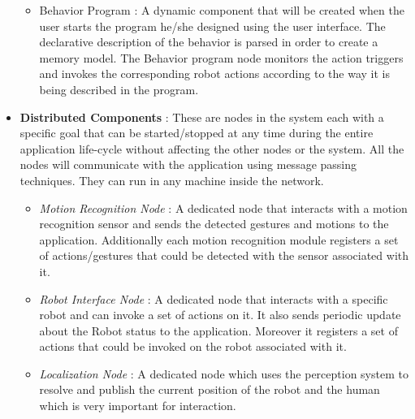 \documentclass{llncs}
\begin{document}
\begin{itemize}
\begin{itemize}
\item Behavior Program : A dynamic component that will be created when the user starts the program he/she designed using the user interface. The declarative description of the behavior is parsed in order to create a memory model. The Behavior program node monitors the action triggers and invokes the corresponding robot actions according to the way it is being described in the program.
\end{itemize}
\item \textbf{Distributed Components} : These are nodes in the system each with a specific goal that can be started/stopped at any time during the entire application life-cycle without affecting the other nodes or the system. All the nodes will communicate with the application using message passing techniques. They can run in any machine inside the network.
\begin{itemize}
\item \emph{Motion Recognition Node} : A dedicated node that interacts with a motion recognition sensor and sends the detected gestures and motions to the application. Additionally each motion recognition module registers a set of actions/gestures that could be detected with the sensor associated with it.
\item \emph{Robot Interface Node} : A dedicated node that interacts with a specific robot and can invoke a set of actions on it. It also sends periodic update about the Robot status to the application. Moreover it registers a set of actions that could be invoked on the robot associated with it.
\item \emph{Localization Node} : A dedicated node which uses the perception system to resolve and publish the current position of the robot and the human which is very important for interaction.
\end{itemize}
\end{itemize}
\end{document}
